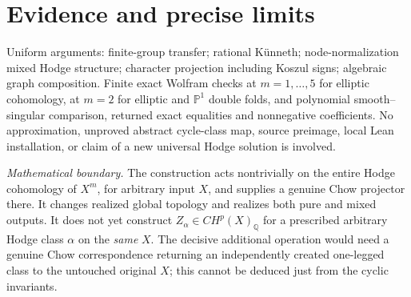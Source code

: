 \documentclass[11pt]{article}
\begin{document}
\section{Evidence and precise limits}
Uniform arguments: finite-group transfer; rational K\"unneth;
node-normalization mixed Hodge structure; character projection
including Koszul signs; algebraic graph composition.
Finite exact Wolfram checks at $m=1,\ldots,5$ for elliptic
cohomology, at $m=2$ for elliptic and $\mathbb P^1$ double
folds, and polynomial smooth--singular comparison, returned
exact equalities and nonnegative coefficients.
No approximation, unproved abstract cycle-class map,
source preimage, local Lean installation, or claim of a
new universal Hodge solution is involved.

\emph{Mathematical boundary.}
The construction acts nontrivially on the entire Hodge
cohomology of $X^m$, for arbitrary input $X$, and supplies
a genuine Chow projector there.  It changes realized
global topology and realizes both pure and mixed outputs.
It does not yet construct $Z_\alpha\in CH^p(X)_{\mathbb Q}$
for a prescribed arbitrary Hodge class $\alpha$ on the
\emph{same} $X$. The decisive additional operation would
need a genuine Chow correspondence returning an independently
created one-legged class to the untouched original $X$;
this cannot be deduced just from the cyclic invariants.
\end{document}
